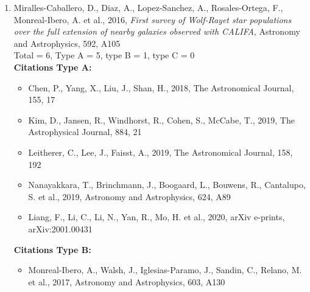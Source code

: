 \documentclass{letter}
\begin{document}
\begin{enumerate}
{\bf Citations Type B:}
\begin{itemize}
\item Barrera-Ballesteros, J., Sanchez, S., Heckman, T., Blanc, G., MaNGA Team, 2017, The Astrophysical Journal, 844, 80
\item Perez-Montero, E., Amorin, R., 2017, Monthly Notices of the Royal Astronomical Society, 467, 1287
\item Sanchez, S., Barrera-Ballesteros, J., Sanchez-Menguiano, L., Walcher, C., Marino, R. et al., 2017, Monthly Notices of the Royal Astronomical Society, 469, 2121
\item Breda, I., Papaderos, P., 2018, Astronomy and Astrophysics, 614, A48
\item Moreno-Raya, M., Galbany, L., Lopez-Sanchez, A., Molla, M., Gonzalez-Gaitan, S. et al., 2018, Monthly Notices of the Royal Astronomical Society, 476, 307
\item Sanchez, S., Barrera-Ballesteros, J., Lopez-Coba, C., Brough, S., Bryant, J. et al., 2019, Monthly Notices of the Royal Astronomical Society, 484, 3042
\end{itemize}
\item Miralles-Caballero, D., Diaz, A., Lopez-Sanchez, A., Rosales-Ortega, F., Monreal-Ibero, A. et al., 2016, {\it First survey of Wolf-Rayet star populations over the full extension of nearby galaxies observed with CALIFA}, Astronomy and Astrophysics, 592, A105 \\ 
Total = 6, Type A = 5, type B = 1, type C = 0 \\ 
{\bf Citations Type A:}
\begin{itemize}
\item Chen, P., Yang, X., Liu, J., Shan, H., 2018, The Astronomical Journal, 155, 17
\item Kim, D., Jansen, R., Windhorst, R., Cohen, S., McCabe, T., 2019, The Astrophysical Journal, 884, 21
\item Leitherer, C., Lee, J., Faisst, A., 2019, The Astronomical Journal, 158, 192
\item Nanayakkara, T., Brinchmann, J., Boogaard, L., Bouwens, R., Cantalupo, S. et al., 2019, Astronomy and Astrophysics, 624, A89
\item Liang, F., Li, C., Li, N., Yan, R., Mo, H. et al., 2020, arXiv e-prints, arXiv:2001.00431
\end{itemize}
{\bf Citations Type B:}
\begin{itemize}
\item Monreal-Ibero, A., Walsh, J., Iglesias-Paramo, J., Sandin, C., Relano, M. et al., 2017, Astronomy and Astrophysics, 603, A130

\end{itemize}
\end{enumerate}
\end{document}
